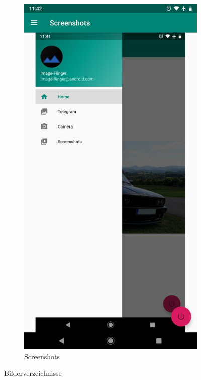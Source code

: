 \begin{figure}[H]
\begin{subfigure}[b]{0.3\linewidth}
    \includegraphics[width=1\linewidth]{figures/screenshots.jpg}
    \caption{Screenshots}
  \end{subfigure}
  \caption{Bilderverzeichnisse}
  \label{fig:folders}
\end{figure}

\newpage
\listoffigures
\newpage




